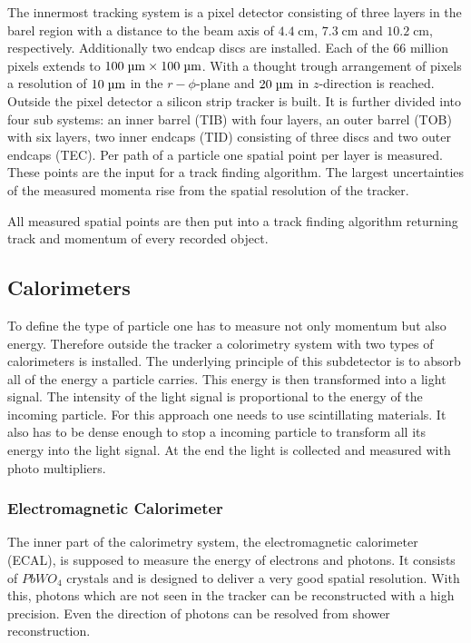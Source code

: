	The innermost tracking system is a pixel detector consisting of three layers in the barel region with a distance to the beam axis of $4.4\;\text{cm}$, $7.3\;\text{cm}$ and $10.2\;\text{cm}$, respectively. Additionally two endcap discs are installed. Each of the $66$ million pixels extends to $100\;\text{\textmu m} \times 100\;\text{\textmu m}$. With a thought trough arrangement of pixels a resolution of $10\;\text{\textmu m}$ in the $r-\phi$-plane \cite{CMStracks} and $20\;\text{\textmu m}$ in $z$-direction is reached. Outside the pixel detector a silicon strip tracker is built. It is further divided into four sub systems: an inner barrel (TIB) with four layers, an outer barrel (TOB) with six layers, two inner endcaps (TID) consisting of three discs and two outer endcaps (TEC).
	Per path of a particle one spatial point per layer is measured. These points are the input for a track finding algorithm. The largest uncertainties of the measured momenta rise from the spatial resolution of the tracker. 
	

	
	All measured spatial points are then put into a track finding algorithm returning track and momentum of every recorded object.

\subsection{Calorimeters}
	To define the type of particle one has to measure not only momentum but also energy. Therefore outside the tracker a colorimetry system with two types of calorimeters is installed. The underlying principle of this subdetector is to absorb all of the energy a particle carries. This energy is then transformed into a light signal. The intensity of the light signal is proportional to the energy of the incoming particle. For this approach one needs to use scintillating materials. It also has to be dense enough to stop a incoming particle to transform all its energy into the light signal. At the end the light is collected and measured with photo multipliers.
\subsubsection{Electromagnetic Calorimeter}
	The inner part of the calorimetry system, the electromagnetic calorimeter (ECAL), is supposed to measure the energy of electrons and photons. It consists of $PbWO_4$ crystals and is designed to deliver a very good spatial resolution. With this, photons which are not seen in the tracker can be reconstructed with a high precision. Even the direction of photons can be resolved from shower reconstruction.
	

